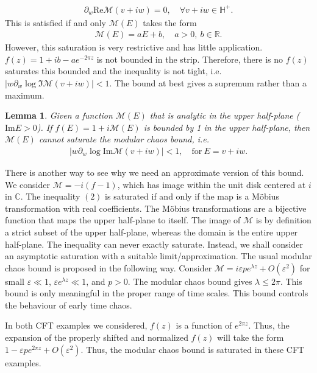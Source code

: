 \documentclass[a4paper,11pt]{article}
\newtheorem{lemma}[theorem]{Lemma}
\theoremstyle{definition}
\theoremstyle{remark}
\newcommand{\mM}{\mathcal{M}}
\newcommand{\p}{\partial}
\begin{document}
\begin{eqnarray}
    \p_w \text{Re} \mM(v+iw)=0, \quad \forall v+iw\in \mathbb{H}^+ .
\end{eqnarray}
This is satisfied if and only $\mM(E)$ takes the form
\begin{eqnarray}
    \mM(E)=a E+b, \quad a>0,\ b\in\mathbb{R}.
\end{eqnarray}
However, this saturation is very restrictive and has little application. $f(z) = 1+ib - a e^{-2\pi z}$ is not bounded in the strip. Therefore, there is no $f(z)$ saturates this bounded and the inequality is not tight, i.e. $|w\p_w \log \Im \mM(v+iw)| < 1$. The bound at best gives a supremum rather than a maximum.
\begin{lemma}
    Given a function $\mM(E)$ that is analytic in the upper half-plane ($\text{Im} E > 0$). If $f(E) = 1+i\mM(E)$ is bounded by 1 in the upper half-plane, then $\mM(E)$ cannot saturate the modular chaos bound, i.e.
    \begin{align}
        |w\p_w \log \text{Im} \mM(v+iw)| < 1, \quad \text{for}\ E=v+iw.
    \end{align}
\end{lemma}
There is another way to see why we need an approximate version of this bound. We consider $\mM = -i(f-1)$, which has image within the unit disk centered at $i$ in $\mathbb{C}$. The inequality $(2)$ is saturated if and only if the map is a M\"obius transformation with real coefficients. The M\"obius transformations are a bijective function that maps the upper half-plane to itself. The image of $\mM$ is by definition a strict subset of the upper half-plane, whereas the domain is the entire upper half-plane. The inequality can never exactly saturate. Instead, we shall consider an asymptotic saturation with a suitable limit/approximation. The usual modular chaos bound is proposed in the following way\cite{}. Consider $\mM = i\varepsilon p e^{\lambda z} + O(\varepsilon^2)$ for small $\varepsilon \ll 1$, $\varepsilon e^{\lambda z} \ll 1$, and $p>0$. The modular chaos bound gives $\lambda \leq 2\pi$. This bound is only meaningful in the proper range of time scales. This bound controls the behaviour of early time chaos. 

In both CFT examples we considered, $f(z)$ is a function of $e^{2\pi z}$. Thus, the expansion of the properly shifted and normalized $f(z)$ will take the form $1-\varepsilon p e^{2 \pi z} + O(\varepsilon^2)$. Thus, the modular chaos bound is saturated in these CFT examples.
\end{document}
